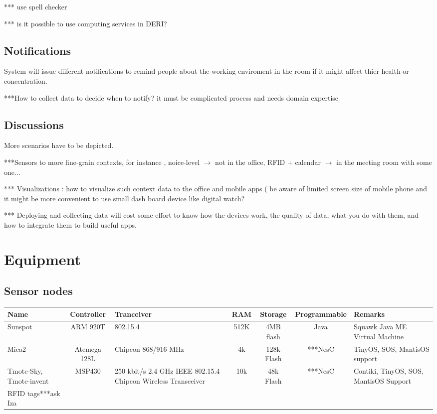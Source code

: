 \documentclass[a4paper, 12pt]{article}
\newcommand{\head}[1]{\textnormal {\textbf{#1}}}
\begin{document}
 *** use spell checker
 
 *** is it possible to use computing services in DERI? 
 
\subsection{Notifications}
 System will issue diiferent notifications to remind people about the working enviroment in the room if it might affect thier health or concentration.
 
 ***How to collect data to decide when to notify? it must be complicated process and needs domain expertise
 
\subsection{Discussions}
 More scenarios have to be depicted.
 
 
 ***Sensors to more fine-grain contexts, for instance , noice-level $\to$ not in the office, RFID + calendar $\to$ in the meeting room with some one...
 
 *** Visualizations : how to visualize such context data to the office and mobile apps ( be aware of limited screen size of mobile phone and it might be more convenient to use small dash board device like digital watch?
 
*** Deploying and collecting data will cost some effort to know how the devices work, the quality of data, what  you do with them, and how to integrate them to build useful apps. 
 
\section{Equipment}
\subsection{Sensor nodes}
\begin{tabular}{|p{2.5cm}|c|p{2cm}|c|c|c|p{2.5cm}|}
\hline
\head{Name} & \head{Controller} & \head{Tranceiver} & \head{RAM} & \head{Storage} &\head{Programmable} &\head{Remarks}\\
\hline
{Sunspot} & {ARM 920T} & {802.15.4} & {512K} & {4MB flash} & {Java } & {Squawk Java ME Virtual Machine} \\
\hline
{Mica2} & {Atemega 128L} & {Chipcon 868/916 MHz}& {4k} & {128k Flash} & {***NesC} & {TinyOS, SOS, MantisOS support} \\
\hline
{Tmote-Sky, Tmote-invent} & {MSP430} & {250 kbit/s 2.4 GHz IEEE 802.15.4 Chipcon Wireless Transceiver} & {10k} & {48k Flash} & {***NesC} & {Contiki, TinyOS, SOS, MantisOS Support}\\
\hline
{RFID tags***ask Iza} &{}&{}&{}&{}&{}&{}\\
\hline
\end{tabular}
\end{document}
